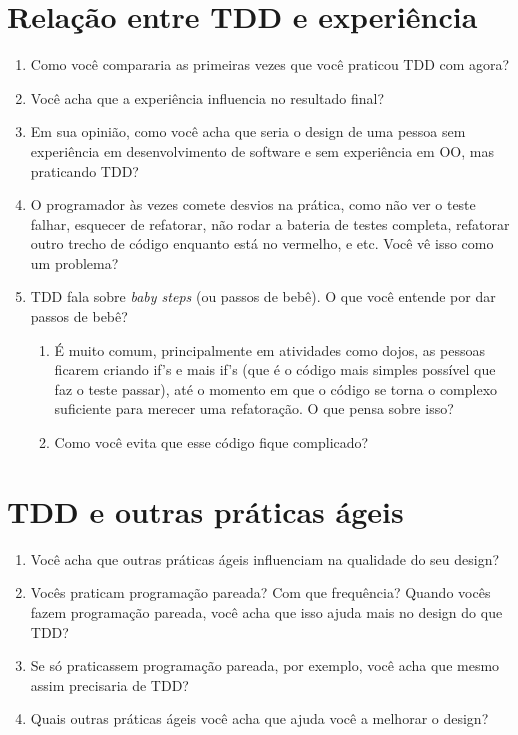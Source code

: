 \section{Relação entre TDD e experiência}
\label{entrevista:experiencia}

\begin{enumerate}
	\item Como você compararia as primeiras vezes que você praticou TDD com agora?

	\item Você acha que a experiência influencia no resultado final?

	\item Em sua opinião, como você acha que seria o design de uma pessoa sem
	experiência em desenvolvimento de software e sem experiência em OO, mas praticando TDD?

	\item O programador às vezes comete desvios na prática, como não ver o teste
	falhar,  esquecer de refatorar, não rodar a bateria de testes completa,
	refatorar outro trecho de código enquanto está no vermelho, e etc. Você vê isso
	como um problema?
	
	\item TDD fala sobre \textit{baby steps} (ou passos de bebê). O que você 
	entende por dar passos de bebê?
	\begin{enumerate}
		\item É muito comum, principalmente em atividades como dojos, as pessoas
		ficarem  criando if's e mais if's (que é o código mais simples possível que
		faz o teste passar),  até o momento em que o código se torna o complexo
		suficiente para merecer uma refatoração. O que pensa sobre isso?

		\item Como você evita que esse código fique complicado?
	\end{enumerate}
\end{enumerate}

\section{TDD e outras práticas ágeis}
\label{entrevista:tdd-e-praticas-ageis}

\begin{enumerate}
	\item Você acha que outras práticas ágeis influenciam na qualidade do seu design?

	\item Vocês praticam programação pareada? Com que frequência? Quando vocês
	fazem programação pareada, você acha que isso ajuda mais no design do que TDD?

	\item Se só praticassem programação pareada, por exemplo, você acha que mesmo
	assim precisaria de TDD?

	\item Quais outras práticas ágeis você acha que ajuda você a melhorar o design?
\end{enumerate}

